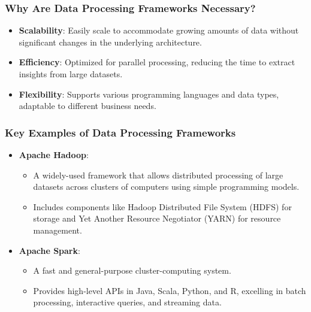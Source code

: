 \documentclass{beamer}
\begin{document}
\begin{frame}[fragile]
    \frametitle{Why Are Data Processing Frameworks Necessary?}
    \begin{itemize}
        \item \textbf{Scalability}: Easily scale to accommodate growing amounts of data without significant changes in the underlying architecture.
        \item \textbf{Efficiency}: Optimized for parallel processing, reducing the time to extract insights from large datasets.
        \item \textbf{Flexibility}: Supports various programming languages and data types, adaptable to different business needs.
    \end{itemize}
\end{frame}

\begin{frame}[fragile]
    \frametitle{Key Examples of Data Processing Frameworks}
    \begin{itemize}
        \item \textbf{Apache Hadoop}: 
        \begin{itemize}
            \item A widely-used framework that allows distributed processing of large datasets across clusters of computers using simple programming models.
            \item Includes components like Hadoop Distributed File System (HDFS) for storage and Yet Another Resource Negotiator (YARN) for resource management.
        \end{itemize}
        \item \textbf{Apache Spark}:
        \begin{itemize}
            \item A fast and general-purpose cluster-computing system.
            \item Provides high-level APIs in Java, Scala, Python, and R, excelling in batch processing, interactive queries, and streaming data.
        \end{itemize}
    \end{itemize}
\end{frame}
\end{document}
